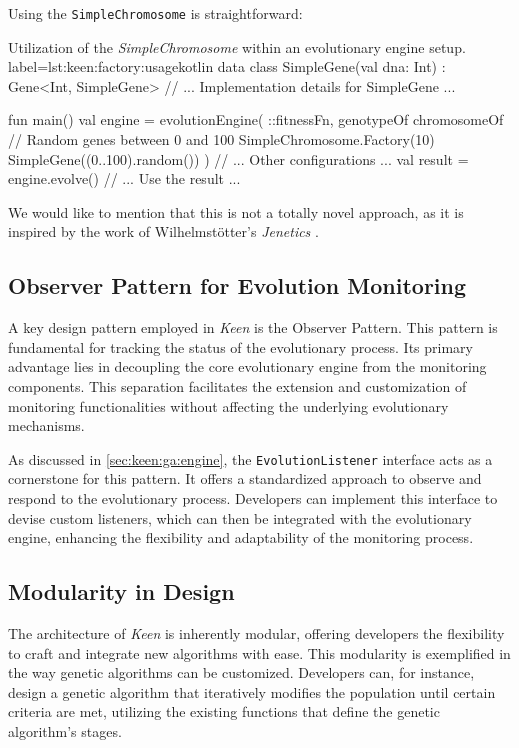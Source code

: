         Using the \texttt{SimpleChromosome} is straightforward:

        \begin{code}{
        Utilization of the \textit{SimpleChromosome} within an evolutionary 
        engine setup.
        }{label=lst:keen:factory:usage}{kotlin}
        data class SimpleGene(val dna: Int) : Gene<Int, SimpleGene> {
            // ... Implementation details for SimpleGene ...
        }
                
        fun main() {
            val engine = evolutionEngine(
                ::fitnessFn,
                genotypeOf {
                    chromosomeOf {
                        // Random genes between 0 and 100
                        SimpleChromosome.Factory(10) { SimpleGene((0..100).random()) }
                    }
                }
            ) {
                // ... Other configurations ...
            }
            val result = engine.evolve()
            // ... Use the result ...
        }
        \end{code}

        We would like to mention that this is not a totally novel approach, as it is inspired by the work of 
        Wilhelmstötter's \textit{Jenetics} \autocite{wilhelmstotterJeneticsJavaGenetica}.

    \subsection{Observer Pattern for Evolution Monitoring}
        A key design pattern employed in \textit{Keen} is the Observer Pattern. This pattern is fundamental for 
        tracking the status of the evolutionary process. Its primary advantage lies in decoupling the core evolutionary 
        engine from the monitoring components. This separation facilitates the extension and customization of 
        monitoring functionalities without affecting the underlying evolutionary mechanisms.

        As discussed in \vref{sec:keen:ga:engine}, the \texttt{EvolutionListener} interface acts as a cornerstone for 
        this pattern. It offers a standardized approach to observe and respond to the evolutionary process. Developers 
        can implement this interface to devise custom listeners, which can then be integrated with the evolutionary 
        engine, enhancing the flexibility and adaptability of the monitoring process.

    \subsection{Modularity in Design}
        The architecture of \textit{Keen} is inherently modular, offering developers
        the flexibility to craft and integrate new algorithms with ease. This
        modularity is exemplified in the way genetic algorithms can be customized.
        Developers can, for instance, design a genetic algorithm that iteratively
        modifies the population until certain criteria are met, utilizing the
        existing functions that define the genetic algorithm's stages.

